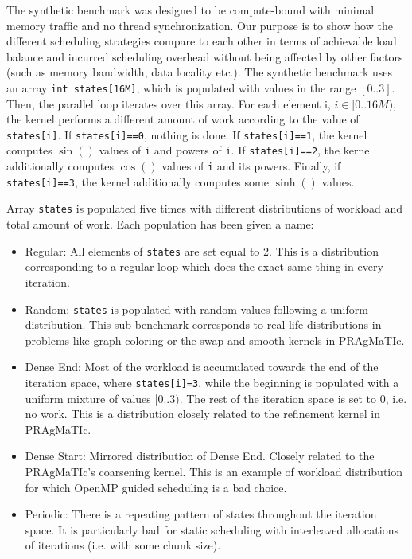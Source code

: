 \documentclass{acm_proc_article-sp}
\newcommand{\PRAGMATIC}{PRAgMaTIc\xspace}
\begin{document}
The synthetic benchmark was designed to be compute-bound with minimal memory
traffic and no thread synchronization. Our purpose is to show how the different
scheduling strategies compare to each other in terms of achievable load balance
and incurred scheduling overhead without being affected by other factors (such
as memory bandwidth, data locality etc.). The synthetic benchmark uses an array
\mbox{\texttt{int states[16M]}}, which is populated with values in the range
$[0..3]$. Then, the parallel loop iterates over this array. For each element i,
$i \in [0..16M)$, the kernel performs a different amount of work according to
the value of \texttt{states[i]}. If \texttt{states[i]==0}, nothing is done. If
\texttt{states[i]==1}, the kernel computes $\sin()$ values of \texttt{i} and
powers of \texttt{i}. If \texttt{states[i]==2}, the kernel additionally computes
$\cos()$ values of \texttt{i} and its powers. Finally, if \texttt{states[i]==3},
the kernel additionally computes some $\sinh()$ values.

Array \texttt{states} is populated five times with different distributions of
workload and total amount of work. Each population has been given a name:
\begin{itemize}
\item Regular: All elements of \texttt{states} are set equal to 2. This is a
distribution corresponding to a regular loop which does the exact same thing in
every iteration.
\item Random: \texttt{states} is populated with random values following a uniform
distribution. This sub-benchmark corresponds to real-life distributions in
problems like graph coloring or the swap and smooth kernels in \PRAGMATIC.
\item Dense End: Most of the workload is accumulated towards the end of the
iteration space, where \texttt{states[i]=3}, while the beginning is populated
with a uniform mixture of values $[0..3)$. The rest of the iteration space is
set to 0, i.e. no work. This is a distribution closely related to the refinement
kernel in \PRAGMATIC.
\item Dense Start: Mirrored distribution of Dense End. Closely related to the
\PRAGMATIC's coarsening kernel. This is an example of workload distribution for
which OpenMP guided scheduling is a bad choice.
\item Periodic: There is a repeating pattern of states throughout the iteration
space. It is particularly bad for static scheduling with interleaved allocations
of iterations (i.e. with some chunk size).
\end{itemize}
\end{document}

